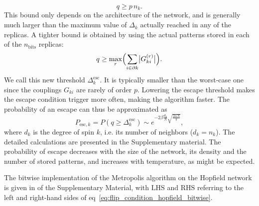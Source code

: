 \begin{equation}
   q \geq p\,n_k.
\label{eq:escape_condition_hopfield_bitwise}
\end{equation}
This bound only depends on the architecture of the network, and is generally much larger than the maximum value of $\Delta_k$ actually reached in any of the replicas. A tighter bound is obtained by using the actual patterns stored in each of the $n_{\mathrm{bits}}$ replicas:
\begin{equation}
   q \geq \max_r \Bigl(\sum_{i \in \partial k}\bigl|G_{ki}^{(r)}\bigr|\Bigr).
\label{eq:escape_condition_hopfield_bitwise_tight}
\end{equation}
We call this new threshold $\Delta_k^\text{esc}$. It is typically smaller than the worst-case one since the couplings $G_{ki}$ are rarely of order $p$. Lowering the escape threshold makes the escape condition trigger more often, making the algorithm faster. The probability of an escape can thus be approximated as
\begin{equation}
    P_{\text{esc},k}=P\left(q \geq \Delta_k^\text{esc}\right) \sim e^{-2 \beta \frac{d_k}{N} \sqrt{\frac{2\alpha N}{\pi}}},
\end{equation}
where $d_k$ is the degree of spin $k$, i.e. its number of neighbors ($d_k = n_k$). The detailed calculations are presented in the Supplementary material. The probability of escape decreases with the size of the network, its density and the number of stored patterns, and increases with temperature, as might be expected.

The bitwise implementation of the Metropolis algorithm on the Hopfield network is given in  of the Supplementary Material, with $\mathrm{LHS}$ and $\mathrm{RHS}$ referring to the left and right-hand sides of eq~\eqref{eq:flip_condition_hopfield_bitwise}.
\FloatBarrier
